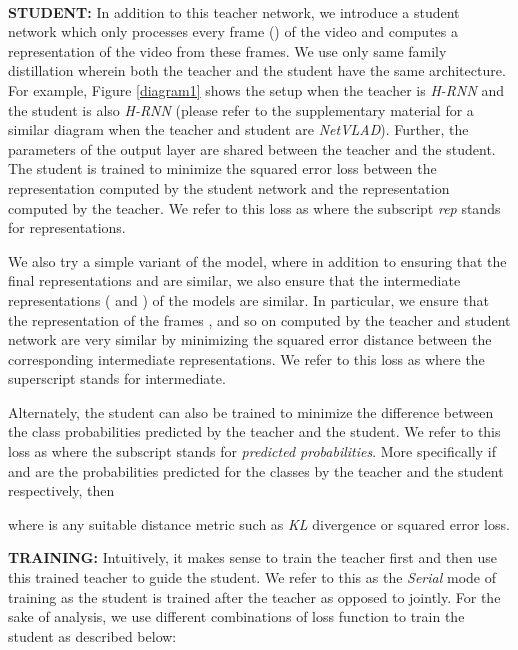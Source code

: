 \documentclass[10pt,twocolumn,letterpaper]{article}
\begin{document}
\\
\noindent \textbf{STUDENT:}
In addition to this teacher network, we introduce a student network which only processes every   frame () of the video and computes a representation  of the video from these  frames. We use only same family distillation wherein both the teacher and the student have the same architecture. For example, Figure \ref{diagram1} shows the setup when the teacher is \textit{H-RNN} and the student is also \textit{H-RNN} (please refer to the supplementary material for a similar diagram when the teacher and student are \textit{NetVLAD}). Further, the parameters of the output layer are shared between the teacher and the student. The student is trained to minimize the squared error loss between the representation computed by the student network and the representation computed by the teacher. We refer to this loss as  where the subscript \textit{rep} stands for representations. 



We also try a simple variant of the model, where in addition to ensuring that the final representations  and   are similar, we also ensure that the intermediate representations ( and ) of the models are similar. In particular, we ensure that the representation of the frames ,  and so on computed by the teacher and  student network are very similar by minimizing the squared error distance between the corresponding intermediate representations. We refer to this loss as  where the superscript  stands for intermediate. 

Alternately, the student can also be trained to minimize the difference between the class probabilities predicted by the teacher and the student. We refer to this loss as  where the subscript  stands for \textit{predicted probabilities}. More specifically if  and  are the probabilities predicted for the  classes by the teacher and the student respectively, then



where  is any suitable distance metric such as \textit{KL} divergence or squared error loss.
 




\noindent \textbf{TRAINING:} Intuitively, it makes sense to train the teacher first and then use this trained teacher to guide the student. We refer to this as the \textit{Serial} mode of training as the student is trained after the teacher as opposed to jointly. For the sake of analysis, we use different combinations of loss function to train the student as described below:
\end{document}
